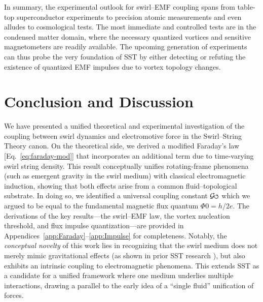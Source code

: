 \documentclass[12pt]{article}
\DeclareRobustCommand{\swirlarrow}{
\mathchoice{\mkern-2mu\scriptstyle\boldsymbol{\circlearrowleft}}%
{\mkern-2mu\scriptstyle\boldsymbol{\circlearrowleft}}%
{\mkern-2mu\scriptscriptstyle\boldsymbol{\circlearrowleft}}%
{\mkern-2mu\scriptscriptstyle\boldsymbol{\circlearrowleft}}
}%
\newcommand{\Gswirl}{\mathcal{G}\swirlarrow}
\begin{document}
In summary, the experimental outlook for swirl–EMF coupling spans from table-top superconductor experiments to precision atomic measurements and even alludes to cosmological tests. The most immediate and controlled tests are in the condensed matter domain, where the necessary quantized vortices and sensitive magnetometers are readily available. The upcoming generation of experiments can thus probe the very foundation of SST by either detecting or refuting the existence of quantized EMF impulses due to vortex topology changes.


\section{Conclusion and Discussion}\label{sec:conclusion}

We have presented a unified theoretical and experimental investigation of the coupling between swirl dynamics and electromotive force in the Swirl--String Theory canon. On the theoretical side, we derived a modified Faraday's law [Eq.~\eqref{eq:faraday-mod}] that incorporates an additional term due to time-varying swirl string density. This result conceptually unifies rotating-frame phenomena (such as emergent gravity in the swirl medium) with classical electromagnetic induction, showing that both effects arise from a common fluid–topological substrate. In doing so, we identified a universal coupling constant $\Gswirl$ which we argued to be equal to the fundamental magnetic flux quantum $\Phi{0}=h/2e$. The derivations of the key results—the swirl–EMF law, the vortex nucleation threshold, and flux impulse quantization—are provided in Appendices~\ref{app:Faraday}--\ref{app:Impulse} for completeness. Notably, the \emph{conceptual novelty} of this work lies in recognizing that the swirl medium does not merely mimic gravitational effects (as shown in prior SST research \cite{Iskandarani2025RotatingFrame}), but also exhibits an intrinsic coupling to electromagnetic phenomena. This extends SST as a candidate for a unified framework where one medium underlies multiple interactions, drawing a parallel to the early idea of a ``single fluid'' unification of forces.
\end{document}
